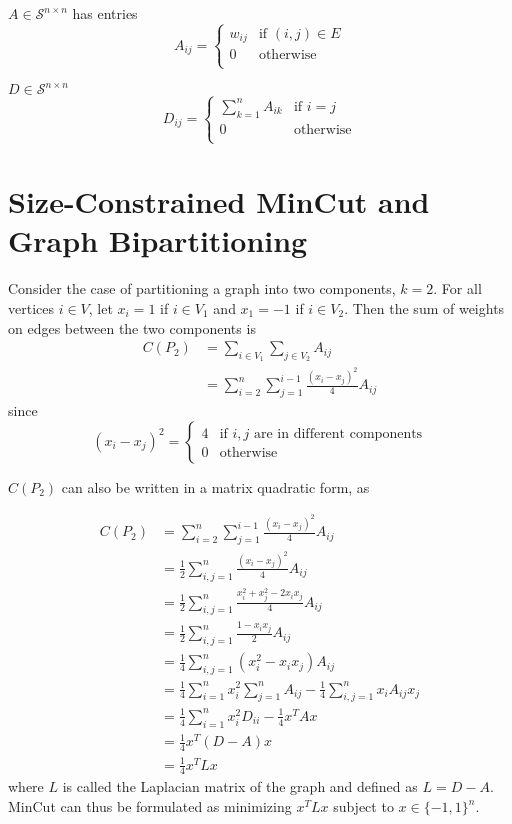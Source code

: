 \begin{definition}
 $A \in \mathcal{S}^{n \times n}$ has entries
\[
A_{ij} = \begin{cases}
  w_{ij} & \text{if } (i,j) \in E \\
  0      & \text{otherwise} \\
\end{cases}
\]
\end{definition}

\begin{definition}
 $D \in \mathcal{S}^{n \times n}$
\[
D_{ij} = \begin{cases}
  \sum_{k = 1}^n A_{ik} & \text{if } i = j \\
  0                     & \text{otherwise} \\
\end{cases}
\]
\end{definition}

\section{Size-Constrained MinCut and Graph Bipartitioning}

Consider the case of partitioning a graph into two components, $k = 2$.
For all vertices $i \in V$, let $x_i = 1$ if $i \in V_1$ and
$x_1 = -1$ if $i \in V_2$. Then the sum of weights on edges between the
two components is
\begin{align*}
C(P_2)
&= \sum_{i \in V_1} \sum_{j \in V_2} A_{ij} \\
&= \sum_{i = 2}^n \sum_{j = 1}^{i-1} \frac{(x_i - x_j)^2}{4} A_{ij} 
\end{align*}
since
\[ (x_i - x_j)^2 = \begin{cases}
	4 & \mbox{if } i,j \mbox{ are in different components} \\
	0 & \mbox{otherwise}
\end{cases}\]

$C(P_2)$ can also be written in a matrix quadratic form, as

\begin{align*}
C(P_2)
&= \sum_{i = 2}^n \sum_{j = 1}^{i-1} \frac{(x_i - x_j)^2}{4} A_{ij} \\
&= \frac{1}{2} \sum_{i,j = 1}^n \frac{(x_i - x_j)^2}{4} A_{ij} \\
&= \frac{1}{2} \sum_{i,j = 1}^n
   \frac{x_i^2 + x_j^2 - 2 x_i x_j}{4} A_{ij} \\
&= \frac{1}{2} \sum_{i,j = 1}^n \frac{1 - x_i x_j}{2} A_{ij} \\
&= \frac{1}{4} \sum_{i,j = 1}^n (x_i^2 - x_i x_j) A_{ij} \\
&= \frac{1}{4} \sum_{i = 1}^n x_i^2 \sum_{j = 1}^n A_{ij}
 - \frac{1}{4} \sum_{i,j = 1}^n x_i A_{ij} x_j \\
&= \frac{1}{4} \sum_{i = 1}^n x_i^2 D_{ii} - \frac{1}{4} x^T A x \\
&= \frac{1}{4} x^T (D - A) x \\
&= \frac{1}{4} x^T L x
\end{align*}
where $L$ is called the Laplacian matrix of the graph and defined as
$L = D - A$. MinCut can thus be formulated as minimizing $x^T L x$
subject to $x \in \{-1, 1\}^n$.

